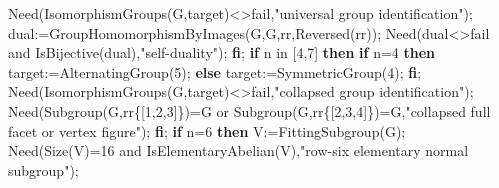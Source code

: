 \documentclass[
  11pt,
  a4paper,
]{article}
\newenvironment{Shaded}{}{}
\newcommand{\BuiltInTok}[1]{\textcolor[rgb]{0.00,0.50,0.00}{#1}}
\newcommand{\ConstantTok}[1]{\textcolor[rgb]{0.53,0.00,0.00}{#1}}
\newcommand{\ControlFlowTok}[1]{\textcolor[rgb]{0.00,0.44,0.13}{\textbf{#1}}}
\newcommand{\ExtensionTok}[1]{#1}
\newcommand{\FloatTok}[1]{\textcolor[rgb]{0.25,0.63,0.44}{#1}}
\newcommand{\NormalTok}[1]{#1}
\newcommand{\OperatorTok}[1]{\textcolor[rgb]{0.40,0.40,0.40}{#1}}
\newcommand{\StringTok}[1]{\textcolor[rgb]{0.25,0.44,0.63}{#1}}
\newcommand{\VariableTok}[1]{\textcolor[rgb]{0.10,0.09,0.49}{#1}}
\begin{document}
\begin{Shaded}
\begin{Highlighting}[]
    \VariableTok{Need}\NormalTok{(}\BuiltInTok{IsomorphismGroups}\NormalTok{(}\VariableTok{G}\OperatorTok{,}\VariableTok{target}\NormalTok{)}\OperatorTok{\textless{}\textgreater{}}\ConstantTok{fail}\OperatorTok{,}\StringTok{"universal group identification"}\NormalTok{)}\OperatorTok{;}
    \VariableTok{dual}\OperatorTok{:=}\BuiltInTok{GroupHomomorphismByImages}\NormalTok{(}\VariableTok{G}\OperatorTok{,}\VariableTok{G}\OperatorTok{,}\VariableTok{rr}\OperatorTok{,}\BuiltInTok{Reversed}\NormalTok{(}\VariableTok{rr}\NormalTok{))}\OperatorTok{;}
    \VariableTok{Need}\NormalTok{(}\VariableTok{dual}\OperatorTok{\textless{}\textgreater{}}\ConstantTok{fail} \ConstantTok{and} \BuiltInTok{IsBijective}\NormalTok{(}\VariableTok{dual}\NormalTok{)}\OperatorTok{,}\StringTok{"self{-}duality"}\NormalTok{)}\OperatorTok{;}
  \ControlFlowTok{fi}\OperatorTok{;}
  \ControlFlowTok{if} \VariableTok{n} \ExtensionTok{in}\NormalTok{ [}\FloatTok{4}\OperatorTok{,}\FloatTok{7}\NormalTok{] }\ControlFlowTok{then}
    \ControlFlowTok{if} \VariableTok{n}\OperatorTok{=}\FloatTok{4} \ControlFlowTok{then} \VariableTok{target}\OperatorTok{:=}\BuiltInTok{AlternatingGroup}\NormalTok{(}\FloatTok{5}\NormalTok{)}\OperatorTok{;} \ControlFlowTok{else} \VariableTok{target}\OperatorTok{:=}\BuiltInTok{SymmetricGroup}\NormalTok{(}\FloatTok{4}\NormalTok{)}\OperatorTok{;} \ControlFlowTok{fi}\OperatorTok{;}
    \VariableTok{Need}\NormalTok{(}\BuiltInTok{IsomorphismGroups}\NormalTok{(}\VariableTok{G}\OperatorTok{,}\VariableTok{target}\NormalTok{)}\OperatorTok{\textless{}\textgreater{}}\ConstantTok{fail}\OperatorTok{,}\StringTok{"collapsed group identification"}\NormalTok{)}\OperatorTok{;}
    \VariableTok{Need}\NormalTok{(}\BuiltInTok{Subgroup}\NormalTok{(}\VariableTok{G}\OperatorTok{,}\VariableTok{rr}\NormalTok{\{[}\FloatTok{1}\OperatorTok{,}\FloatTok{2}\OperatorTok{,}\FloatTok{3}\NormalTok{]\})}\OperatorTok{=}\VariableTok{G} \ConstantTok{or} \BuiltInTok{Subgroup}\NormalTok{(}\VariableTok{G}\OperatorTok{,}\VariableTok{rr}\NormalTok{\{[}\FloatTok{2}\OperatorTok{,}\FloatTok{3}\OperatorTok{,}\FloatTok{4}\NormalTok{]\})}\OperatorTok{=}\VariableTok{G}\OperatorTok{,}\StringTok{"collapsed full facet or vertex figure"}\NormalTok{)}\OperatorTok{;}
  \ControlFlowTok{fi}\OperatorTok{;}
  \ControlFlowTok{if} \VariableTok{n}\OperatorTok{=}\FloatTok{6} \ControlFlowTok{then}
    \VariableTok{V}\OperatorTok{:=}\BuiltInTok{FittingSubgroup}\NormalTok{(}\VariableTok{G}\NormalTok{)}\OperatorTok{;} \VariableTok{Need}\NormalTok{(}\BuiltInTok{Size}\NormalTok{(}\VariableTok{V}\NormalTok{)}\OperatorTok{=}\FloatTok{16} \ConstantTok{and} \BuiltInTok{IsElementaryAbelian}\NormalTok{(}\VariableTok{V}\NormalTok{)}\OperatorTok{,}\StringTok{"row{-}six elementary normal subgroup"}\NormalTok{)}\OperatorTok{;}

\end{Highlighting}
\end{Shaded}
\end{document}
